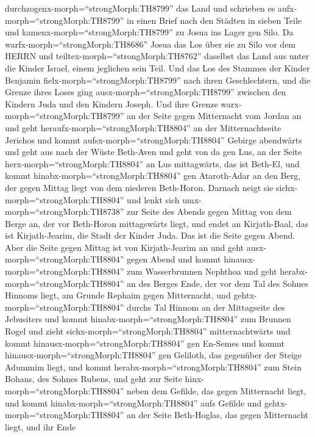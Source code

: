 durchzogenx-morph=``strongMorph:TH8799'' das Land und schrieben es
aufx-morph=``strongMorph:TH8799'' in einen Brief nach den Städten in
sieben Teile und kamenx-morph=``strongMorph:TH8799'' zu Josua ins Lager
gen Silo.  Da warfx-morph=``strongMorph:TH8686'' Josua das
Los über sie zu Silo vor dem HERRN und
teiltex-morph=``strongMorph:TH8762'' daselbst das Land aus unter die
Kinder Israel, einem jeglichen sein Teil.  Und das Los des
Stammes der Kinder Benjamin fielx-morph=``strongMorph:TH8799'' nach
ihren Geschlechtern, und die Grenze ihres Loses ging
ausx-morph=``strongMorph:TH8799'' zwischen den Kindern Juda und den
Kindern Joseph.  Und ihre Grenze
warx-morph=``strongMorph:TH8799'' an der Seite gegen Mitternacht vom
Jordan an und geht heraufx-morph=``strongMorph:TH8804'' an der
Mitternachtseite Jerichos und kommt aufsx-morph=``strongMorph:TH8804''
Gebirge abendwärts und geht aus nach der Wüste Beth-Aven 
und geht von da gen Lus, an der Seite herx-morph=``strongMorph:TH8804''
an Lus mittagwärts, das ist Beth-El, und kommt
hinabx-morph=``strongMorph:TH8804'' gen Ataroth-Adar an den Berg, der
gegen Mittag liegt von dem niederen Beth-Horon.  Darnach
neigt sie sichx-morph=``strongMorph:TH8804'' und lenkt sich
umx-morph=``strongMorph:TH8738'' zur Seite des Abends gegen Mittag von
dem Berge an, der vor Beth-Horon mittagswärts liegt, und endet an
Kirjath-Baal, das ist Kirjath-Jearim, die Stadt der Kinder Juda. Das ist
die Seite gegen Abend.  Aber die Seite gegen Mittag ist von
Kirjath-Jearim an und geht ausx-morph=``strongMorph:TH8804'' gegen Abend
und kommt hinausx-morph=``strongMorph:TH8804'' zum Wasserbrunnen
Nephthoa  und geht herabx-morph=``strongMorph:TH8804'' an
des Berges Ende, der vor dem Tal des Sohnes Hinnoms liegt, am Grunde
Rephaim gegen Mitternacht, und gehtx-morph=``strongMorph:TH8804'' durchs
Tal Hinnom an der Mittagseite des Jebusiters und kommt
hinabx-morph=``strongMorph:TH8804'' zum Brunnen Rogel  und
zieht sichx-morph=``strongMorph:TH8804'' mitternachtwärts und kommt
hinausx-morph=``strongMorph:TH8804'' gen En-Semes und kommt
hinausx-morph=``strongMorph:TH8804'' gen Geliloth, das gegenüber der
Steige Adummim liegt, und kommt herabx-morph=``strongMorph:TH8804'' zum
Stein Bohans, des Sohnes Rubens,  und geht zur Seite
hinx-morph=``strongMorph:TH8804'' neben dem Gefilde, das gegen
Mitternacht liegt, und kommt hinabx-morph=``strongMorph:TH8804'' aufs
Gefilde  und gehtx-morph=``strongMorph:TH8804'' an der
Seite Beth-Hoglas, das gegen Mitternacht liegt, und ihr Ende
